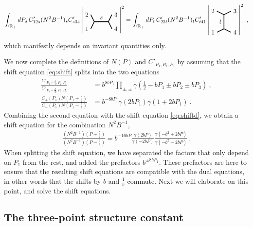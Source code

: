 \documentclass[12pt, a4paper, notitlepage, twoside]{report}
\numberwithin{equation}{section}
\theoremstyle{break}
\begin{document}
\begin{align}
 \int_{i\mathbb{R}_+} dP_s\, C'_{12s}(N^2B^{-1})_s C'_{s34} \left| 
 \begin{tikzpicture}[baseline=(current  bounding  box.center), very thick, scale = .2]
\draw (-1,2) node [left] {$2$} -- (0,0) -- node [above] {$s$} (4,0) -- (5,2) node [right] {$3$};
\draw (-1,-2) node [left] {$1$} -- (0,0);
\draw (4,0) -- (5,-2) node [right] {$4$};
\end{tikzpicture} 
\right|^2 = \int_{i\mathbb{R}_+} dP_t\, C'_{23t}(N^2B^{-1})_tC'_{t41} \left|
\begin{tikzpicture}[baseline=(current  bounding  box.center), very thick, scale = .2]
 \draw (-2,3) node [left] {$2$} -- (0,2) -- node [left] {$t$} (0,-2) -- (-2, -3) node [left] {$1$};
\draw (0,2) -- (2,3) node [right] {$3$};
\draw (0,-2) -- (2, -3) node [right] {$4$};
\end{tikzpicture}
\right|^2\ ,
\end{align}
which manifestly depends on invariant quantities only.

We now complete the definitions of $N(P)$ and $C'_{P_1,P_2,P_3}$
by assuming that the shift equation \eqref{eq:shift} splits into the two equations 
\begin{align}
\frac{C'_{P_1+\frac{b}{2},P_2,P_3}}{C'_{P_1-\frac{b}{2},P_2,P_3} } 
 &=b^{8bP_1}\prod_{\pm,\pm} \gamma(\tfrac12 -bP_1 \pm bP_2 \pm bP_3)\ ,
 \label{cps}
 \\
\frac{C_+(P_1) N(P_1+\frac{b}{2})}{C_-(P_1) N(P_1-\frac{b}{2}) } 
 &=b^{-8bP_1}\gamma(2bP_1) \gamma(1+2bP_1) \ .
 \label{cns}
\end{align}
Combining the second equation with the shift equation \eqref{eq:shiftd}, we obtain a shift equation for the combination $N^2B^{-1}$,
\begin{align}
 \frac{\left(N^2B^{-1}\right)(P+\frac{b}{2})}{\left(N^2B^{-1}\right)(P-\frac{b}{2})} = b^{-16bP} \frac{\gamma(2bP)}{\gamma(-2bP)} \frac{\gamma(-b^2+2bP)}{\gamma(-b^2-2bP)}\ .
 \label{nbs}
\end{align}
When splitting the shift equation, we have separated the factors that only depend on $P_1$ from the rest, and added the prefactors $b^{\pm 8bP_1}$. These prefactors are here to ensure that the resulting shift equations are compatible with the dual equations, in other words that the shifts by $b$ and $\frac{1}{b}$ commute. Next we will elaborate on this point, and solve the shift equations.


\subsection{The three-point structure constant \label{sectpf}}
\end{document}
